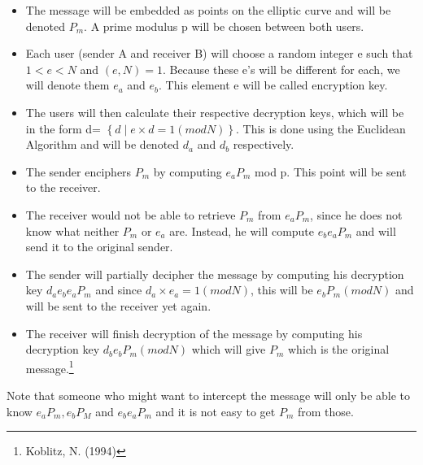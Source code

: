 \begin{itemize}
\item The message will be embedded as points on the elliptic curve and will be denoted $P_m$. A prime modulus p will be chosen between both users.
\item Each user (sender A and receiver B) will choose a random integer e such that $1<e<N$ and $(e,N)=1$. Because these e’s will be different for each, we will denote them $e_a$ and $e_b$. This element e will be called encryption key.
\item The users will then calculate their respective decryption keys, which will be in the form d= $\left\{ d \mid e \times d=1 (modN)\right\}$. This is done using the Euclidean Algorithm and will be denoted $d_a$ and $d_b$ respectively.
\item The sender enciphers $P_m$ by computing $e_aP_m$ mod p. This point will be sent to the receiver.
\item The receiver would not be able to retrieve $P_m$ from $e_aP_m$, since he does not know what neither $P_m$ or $e_a$ are. Instead, he will compute $e_be_aP_m$ and will send it to the original sender.

\item The sender will partially decipher the message by computing his decryption key $d_ae_be_aP_m$ and since $d_a \times e_a = 1 (modN)$, this will be $e_bP_m (modN)$ and will be sent to the receiver yet again.

\item The receiver will finish decryption of the message by computing his decryption key $d_be_bP_m (modN)$ which will give $P_m$ which is the original message.\footnote{Koblitz, N. (1994)}

\end{itemize}


\hspace{10mm} Note that someone who might want to intercept the message will only be able to know $e_aP_m, e_bP_M$ and $e_be_aP_m$ and it is not easy to get $P_m$ from those.


